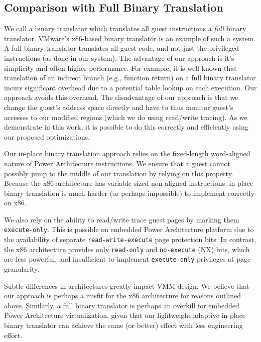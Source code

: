 \documentclass[10pt,twocolumn]{article}
\begin{document}
\subsection{Comparison with Full Binary Translation}
\label{sec:comparison_with_full_bt}
We call a binary translator which translates all guest instructions a {\em full}
binary translator.
VMware's x86-based binary translator\cite{adams:asplos06} is an example of
such a system. A full binary translator translates all guest code, and not
just the privileged instructions (as done in our system). The advantage of
our approach is it's simplicity and often higher performance.
For example, it is well known that translation of an indirect branch (e.g., function
return)
on a full binary translator incurs significant overhead due to a potential
table lookup on each execution. Our approach avoids this overhead.
The disadvantage of our approach is that we change the guest's address space
directly and have to thus monitor guest's accesses to our modified regions
(which we do using read/write tracing). As we demonstrate in this work, it is
possible to do this correctly and efficiently using our proposed optimizations.

Our in-place binary translation approach relies on the fixed-length word-aligned
nature of Power Architecture instructions. We ensure that a guest cannot possibly
jump to the middle of our translation by relying on this property. Because the
x86 architecture has variable-sized non-aligned instructions, in-place binary
translation is much harder (or perhaps impossible) to implement correctly
on x86.

We also rely on the ability to read/write trace guest pages by marking them
{\tt execute-only}. This is possible on embedded Power Architecture
platform due to the
availability of separate
{\tt read-write-execute} page protection bits.
In contrast, the x86 architecture provides only {\tt read-only} and
{\tt no-execute} (NX) bits, which are less powerful, and insufficient
to implement {\tt execute-only} privileges at page granularity.

Subtle
differences in architectures greatly impact VMM design. We believe that our
approach is perhaps a misfit for the x86 architecture for reasons outlined above.
Similarly, a full binary translator is perhaps an overkill for embedded
Power Architecture virtualization, given that our lightweight adaptive in-place binary translator
can achieve the same (or better) effect with less engineering effort.
\end{document}
